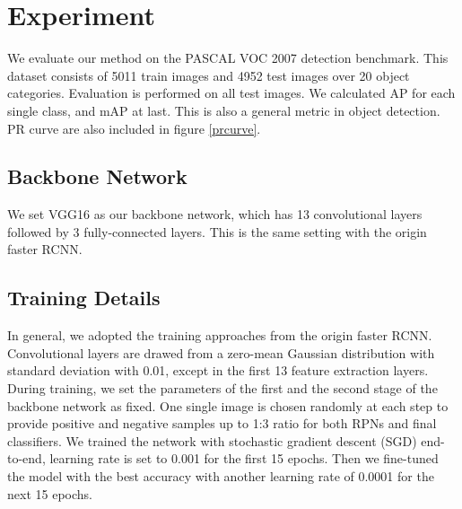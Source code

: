 \documentclass[10pt,twocolumn,letterpaper]{article}
\begin{document}
\begin{table}[ht]
\centering
{}
\caption{Average precision of different classes reported on origin faster RCNN and out ARS-Net, highlighted ones are categories with a higher mAP}
\label{Exp1}

\end{table}

\section{Experiment}
We evaluate our method on the PASCAL VOC 2007 detection benchmark. This dataset consists of 5011 train images and 4952 test images over 20 object categories. Evaluation is performed on all test images. We calculated AP for each single class, and mAP at last. This is also a general metric in object detection. PR curve are also included in figure \ref{prcurve}. 
\subsection{Backbone Network}
We set VGG16\cite{vgg} as our backbone network, which has 13 convolutional layers followed by 3 fully-connected layers. This is the same setting with the origin faster RCNN\cite{fastRCNN}.

\subsection{Training Details}
In general, we adopted the training approaches from the origin faster RCNN. Convolutional layers are drawed from a zero-mean Gaussian distribution with standard deviation with 0.01, except in the first 13 feature extraction layers\cite{fasterRCNN}. During training, we set the parameters of the first and the second stage of the backbone network as fixed. One single image is chosen randomly at each step to provide positive and negative samples up to 1:3 ratio for both RPNs and final classifiers. We trained the network with stochastic gradient descent (SGD) end-to-end, learning rate is set to 0.001 for the first 15 epochs. Then we fine-tuned the model with the best accuracy with another learning rate of 0.0001 for the next 15 epochs.
\end{document}
